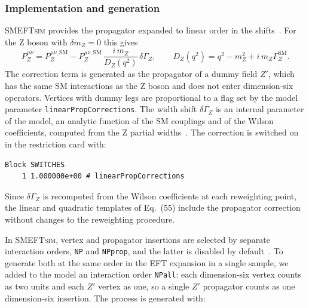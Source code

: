 \subsubsection{Implementation and generation}

\textsc{SMEFTsim} provides the propagator expanded to linear order in the
shifts~\cite{Brivio:2020onw}. For the Z boson with $\delta m_Z = 0$ this gives
\begin{equation}
  P_Z^{\mu\nu} = P_Z^{\mu\nu,\mathrm{SM}}
  - P_Z^{\mu\nu,\mathrm{SM}}\,\frac{i\, m_Z}{D_Z(q^2)}\,\delta\Gamma_Z ,
  \qquad D_Z(q^2) = q^2 - m_Z^2 + i\, m_Z \Gamma_Z^{\mathrm{SM}} .
  \label{eq:propcorr_linear}
\end{equation}
The correction term is generated as the propagator of a dummy field $Z'$, which
has the same SM interactions as the Z boson and does not enter dimension-six
operators. Vertices with dummy legs are proportional to a flag set by the model
parameter \texttt{linearPropCorrections}. The width shift $\delta\Gamma_Z$ is an internal parameter
of the model, an analytic function of the SM couplings and of the Wilson
coefficients, computed from the Z partial widths~\cite[App.~A]{Brivio:2020onw}.
The correction is switched on in the restriction card with:

\begin{verbatim}
Block SWITCHES
    1 1.000000e+00 # linearPropCorrections
\end{verbatim}

Since $\delta\Gamma_Z$ is recomputed from the Wilson coefficients at each
reweighting point, the linear and quadratic templates of
Eq.~(55)
include the propagator correction without changes to the reweighting procedure.

In \textsc{SMEFTsim}, vertex and propagator insertions are selected by separate
interaction orders, \texttt{NP} and \texttt{NPprop}, and the latter is disabled
by default~\cite{Brivio:2020onw}. To generate both at the same order in the EFT
expansion in a single sample, we added to the model an interaction order
\texttt{NPall}: each dimension-six vertex
counts as two units and each $Z'$ vertex as one, so a single $Z'$ propagator
counts as one dimension-six insertion. The process is generated with:

